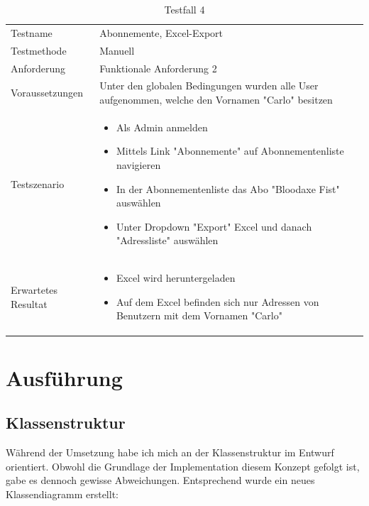 \begin{table}[h!]
   \begin{tabular}{|L{0.4\textwidth}|L{0.6\textwidth}|}
       \hline
         \\[12pt]
       \hline
        Testname & Abonnemente, Excel-Export \\
       \hline
       Testmethode & Manuell \\
       \hline
        Anforderung & Funktionale Anforderung 2 \\
       \hline
       Voraussetzungen & Unter den globalen Bedingungen wurden alle User aufgenommen, welche den Vornamen
       "Carlo" besitzen \\
       \hline
       Testszenario & 
       \begin{itemize}
         \item Als Admin anmelden
         \item Mittels Link "Abonnemente" auf Abonnementenliste navigieren
         \item In der Abonnementenliste das Abo "Bloodaxe Fist" auswählen
         \item Unter Dropdown "Export" Excel und danach "Adressliste" auswählen
       \end{itemize} \\
       \hline
       Erwartetes Resultat & 
       \begin{itemize}
         \item Excel wird heruntergeladen
         \item Auf dem Excel befinden sich nur Adressen von Benutzern mit dem Vornamen "Carlo"
      \end{itemize}\\
      \hline
     \end{tabular}
     \caption{Testfall 4}
\end{table}

\chapter{Ausführung}
\section{Klassenstruktur}
Während der Umsetzung habe ich mich an der Klassenstruktur im Entwurf orientiert. Obwohl die Grundlage der Implementation diesem Konzept
gefolgt ist, gabe es dennoch gewisse Abweichungen. Entsprechend wurde ein neues Klassendiagramm erstellt:

